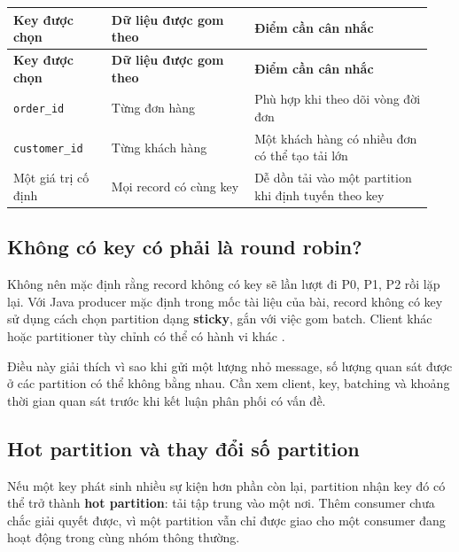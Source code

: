 \begingroup\small
\renewcommand{\arraystretch}{1.23}
\begin{longtable}{@{}p{0.22\linewidth}p{0.32\linewidth}p{0.4\linewidth}@{}}
\toprule
\rowcolor{rowLavender}
\textbf{Key được chọn} & \textbf{Dữ liệu được gom theo} & \textbf{Điểm cần cân nhắc} \\
\midrule
\endfirsthead
\toprule
\rowcolor{rowLavender}
\textbf{Key được chọn} & \textbf{Dữ liệu được gom theo} & \textbf{Điểm cần cân nhắc} \\
\midrule
\endhead
\bottomrule
\endfoot
\texttt{order\_\allowbreak{}id} & Từng đơn hàng & Phù hợp khi theo dõi vòng đời đơn \\
\texttt{customer\_\allowbreak{}id} & Từng khách hàng & Một khách hàng có nhiều đơn có thể tạo tải lớn \\
Một giá trị cố định & Mọi record có cùng key & Dễ dồn tải vào một partition khi định tuyến theo key \\
\end{longtable}
\endgroup

\FloatBarrier
{}
\subsection{Không có key có phải là round robin?}

Không nên mặc định rằng record không có key sẽ lần lượt đi P0, P1, P2 rồi lặp lại. Với Java producer mặc định trong mốc tài liệu của bài, record không có key sử dụng cách chọn partition dạng \textbf{sticky}, gắn với việc gom batch. Client khác hoặc partitioner tùy chỉnh có thể có hành vi khác \cite{kafka-producer-configs}.


Điều này giải thích vì sao khi gửi một lượng nhỏ message, số lượng quan sát được ở các partition có thể không bằng nhau. Cần xem client, key, batching và khoảng thời gian quan sát trước khi kết luận phân phối có vấn đề.


\FloatBarrier
{}
\subsection{Hot partition và thay đổi số partition}

Nếu một key phát sinh nhiều sự kiện hơn phần còn lại, partition nhận key đó có thể trở thành \textbf{hot partition}: tải tập trung vào một nơi. Thêm consumer chưa chắc giải quyết được, vì một partition vẫn chỉ được giao cho một consumer đang hoạt động trong cùng nhóm thông thường.


